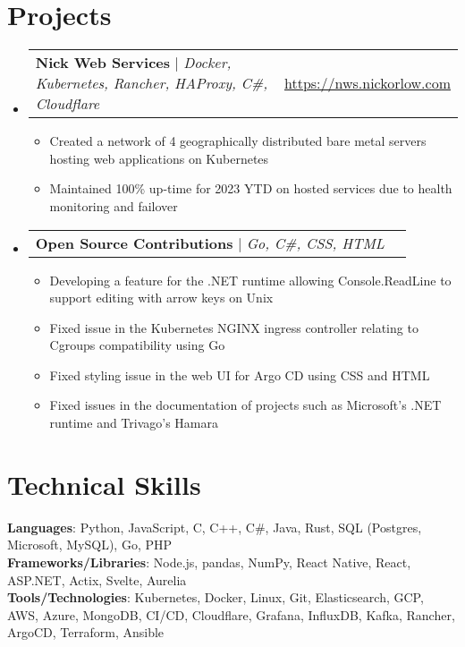 \documentclass[letterpaper,11pt]{article}
\makeatletter
\newcommand{\resumeItem}[1]{
  \item\small{
    {#1 \vspace{-2pt}}
  }
}
\newcommand{\resumeProjectHeading}[2]{
    \item
    \begin{tabular*}{0.97\textwidth}{l@{\extracolsep{\fill}}r}
      \small#1 & \underline{\href{#2}{#2}} \\
    \end{tabular*}\vspace{-7pt}
}
\newcommand{\resumeSubHeadingListStart}{\begin{itemize}[leftmargin=0.15in, label={}]}
\newcommand{\resumeSubHeadingListEnd}{\end{itemize}}
\newcommand{\resumeItemListStart}{\begin{itemize}}
\newcommand{\resumeItemListEnd}{\end{itemize}\vspace{-3pt}}
\makeatother
\begin{document}
\section{Projects}
    \resumeSubHeadingListStart
      \resumeProjectHeading
          {\textbf{Nick Web Services} $|$ \emph{Docker, Kubernetes, Rancher, HAProxy, C\#, Cloudflare}}{https://nws.nickorlow.com}
          \resumeItemListStart
            \resumeItem{Created a network of 4 geographically distributed bare metal servers hosting web applications on Kubernetes}
            \resumeItem{Maintained 100\% up-time for 2023 YTD on hosted services due to health monitoring and failover}
          \resumeItemListEnd
          \resumeProjectHeading
          {\textbf{Open Source Contributions} $|$ \emph{Go, C\#, CSS, HTML}}{}
          \resumeItemListStart
            \resumeItem{Developing a feature for the .NET runtime allowing Console.ReadLine to support editing with arrow keys on Unix}
            \resumeItem{Fixed issue in the Kubernetes NGINX ingress controller relating to Cgroups compatibility using Go}
            \resumeItem{Fixed styling issue in the web UI for Argo CD using CSS and HTML}
            \resumeItem{Fixed issues in the documentation of projects such as Microsoft's .NET runtime and Trivago's Hamara}
          \resumeItemListEnd
    \resumeSubHeadingListEnd

\section{Technical Skills}
 \begin{itemize}[leftmargin=0.15in, label={}]
    \small{\item{
     \textbf{Languages}{:  Python, JavaScript, C, C++, C\#, Java, Rust, SQL (Postgres, Microsoft, MySQL), Go, PHP} \\
     \textbf{Frameworks/Libraries}{: Node.js, pandas, NumPy, React Native, React, ASP.NET, Actix, Svelte, Aurelia} \\
     \textbf{Tools/Technologies}{: Kubernetes, Docker, Linux, Git, Elasticsearch, GCP, AWS, Azure, MongoDB, CI/CD, Cloudflare, Grafana, InfluxDB, Kafka, Rancher, ArgoCD, Terraform, Ansible} \\
    }}
 \end{itemize}


\end{document}
